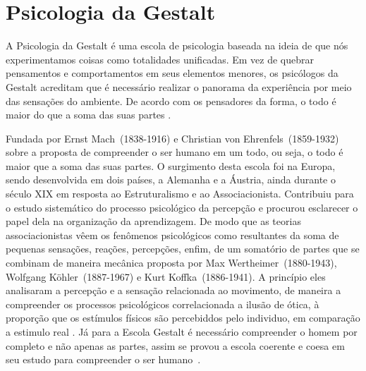\section{Psicologia da Gestalt}\label{gestalt}

A Psicologia da Gestalt é uma escola de psicologia baseada na ideia de que nós experimentamos coisas como totalidades unificadas. 
Em vez de quebrar pensamentos e comportamentos em seus elementos menores, os psicólogos da Gestalt acreditam que é necessário realizar o panorama da experiência por meio das sensações do ambiente. 
De acordo com os pensadores da forma, o todo é maior do que a soma das suas partes \cite{bock1999psicologias}.

Fundada por Ernst Mach~(1838-1916) e Christian von Ehrenfels~(1859-1932) sobre a proposta de compreender o ser humano em um todo, ou seja, o todo é maior que a soma das suas partes.
O surgimento desta escola foi na Europa, sendo desenvolvida em dois países, a Alemanha e a Áustria, ainda durante o século XIX em resposta ao Estruturalismo e ao Associacionista.
Contribuiu para o estudo sistemático do processo psicológico da percepção e procurou esclarecer o papel dela na organização da aprendizagem.
De modo que as teorias associacionistas vêem os fenômenos psicológicos como resultantes da soma de pequenas sensações, reações, percepções, enfim, de um somatório de partes que se combinam de maneira mecânica proposta por Max Wertheimer~(1880-1943), Wolfgang Köhler~(1887-1967) e Kurt Koffka~(1886-1941)\cite{hothersall1997historia}.
A princípio eles analisaram a percepção e a sensação relacionada ao movimento, de maneira a compreender os processos psicológicos correlacionada a ilusão de ótica, à proporção que os estímulos físicos são percebiddos pelo individuo, em comparação a estimulo real \cite{bock1999psicologias}.
Já para a Escola Gestalt é necessário compreender o homem por completo e não apenas as partes, assim se provou a escola coerente e coesa em seu estudo para compreender o ser humano~\cite{silva2007psicologia_educacao}.

